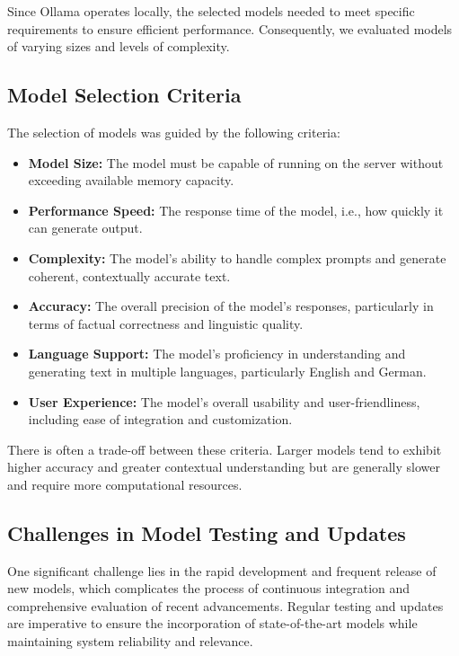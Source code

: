 Since Ollama operates locally, the selected models needed to meet specific requirements to ensure efficient performance. 
Consequently, we evaluated models of varying sizes and levels of complexity.

\subsection{Model Selection Criteria}

The selection of models was guided by the following criteria:

\begin{itemize}
\item \textbf{Model Size:} The model must be capable of running on the server without exceeding available memory capacity.
\item \textbf{Performance Speed:} The response time of the model, i.e., how quickly it can generate output.
\item \textbf{Complexity:} The model's ability to handle complex prompts and generate coherent, contextually accurate text.
\item \textbf{Accuracy:} The overall precision of the model's responses, particularly in terms of factual correctness and linguistic quality.
\item \textbf{Language Support:} The model's proficiency in understanding and generating text in multiple languages, particularly English and German.
\item \textbf{User Experience:} The model's overall usability and user-friendliness, including ease of integration and customization.
\end{itemize}

There is often a trade-off between these criteria. 
Larger models tend to exhibit higher accuracy and greater contextual understanding but are generally slower and 
require more computational resources.

\subsection{Challenges in Model Testing and Updates}

One significant challenge lies in the rapid development and frequent release of new models, 
which complicates the process of continuous integration and comprehensive evaluation of recent advancements. 
Regular testing and updates are imperative to ensure the incorporation of state-of-the-art models while maintaining system reliability and relevance.

